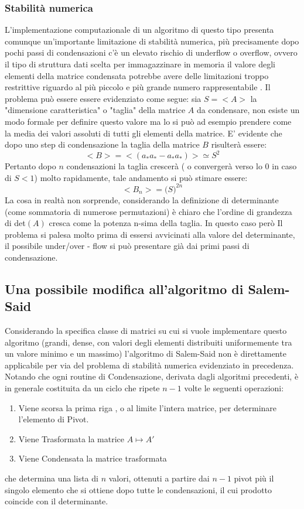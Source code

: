\documentclass{article}
\begin{document}
\subsubsection{Stabilità numerica}
L'implementazione computazionale di un algoritmo di questo tipo presenta comunque un'importante limitazione di stabilità numerica, più precisamente dopo pochi passi di condensazioni c'è un elevato rischio di underflow o overflow, ovvero il tipo di struttura dati scelta per immagazzinare in memoria il valore degli elementi della matrice condensata potrebbe avere delle limitazioni troppo restrittive riguardo al più piccolo e più grande numero rappresentabile .
Il problema può essere essere evidenziato come segue:
sia $S = <A>$ la "dimensione caratteristica" o "taglia" della matrice $A$ da condensare, non esiste un modo formale per definire questo valore ma lo si può ad esempio prendere come la media dei valori assoluti di tutti gli elementi della matrice.
E' evidente che dopo uno step di condensazione la taglia della matrice $B$ risulterà essere:
\begin{equation}
<B> = <(a_{\ast}a_{\ast} -a_{\ast}a_{\ast})>  \simeq S^{2}
\end{equation}
Pertanto dopo $n$ condensazioni la taglia crescerà ( o convergerà verso lo 0 in caso di $S<1$) molto rapidamente, tale andamento si può stimare essere:
\begin{equation}
<B_{n}> = \big( S \big) ^{2n}
\end{equation}
La cosa in realtà non sorprende, considerando la definizione di determinante (come sommatoria di numerose permutazioni) è chiaro che l'ordine di grandezza di det$(A)$ cresca come la potenza n-sima della taglia. In questo caso però Il problema si palesa molto prima di essersi avvicinati alla valore del determinante, il possibile under/over - flow  si può presentare già dai primi passi di condensazione.

\subsection{Una possibile modifica all'algoritmo di Salem-Said}
Considerando la specifica classe di matrici su cui si vuole implementare questo algoritmo (grandi, dense, con valori degli elementi distribuiti uniformemente tra un valore minimo e un massimo) l'algoritmo di Salem-Said non è direttamente applicabile per via del problema di stabilità numerica evidenziato in precedenza.
Notando che ogni routine di Condensazione, derivata dagli algoritmi precedenti, è in generale costituita da un ciclo che ripete $n-1$ volte le seguenti operazioni:
\begin{enumerate}
\item Viene scorsa la prima riga , o al limite l'intera matrice, per determinare l'elemento di Pivot.
\item Viene Trasformata la matrice $ A \mapsto A'$
\item Viene Condensata la matrice trasformata
\end{enumerate}
che determina una lista di $n$ valori, ottenuti a partire dai $n-1$ pivot più il singolo elemento che si ottiene dopo tutte le condensazioni, il cui prodotto coincide con il determinante.
\end{document}
